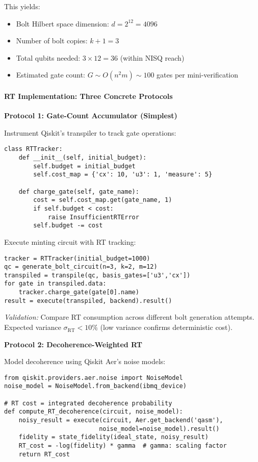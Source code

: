 \documentclass[a4paper,10.5pt,twoside]{article}
\begin{document}
This yields:
\begin{itemize}
    \item Bolt Hilbert space dimension: $d = 2^{12} = 4096$
    \item Number of bolt copies: $k+1 = 3$
    \item Total qubits needed: $3 \times 12 = 36$ (within NISQ reach)
    \item Estimated gate count: $G \sim O(n^2 m) \sim 100$ gates per mini-verification
\end{itemize}

\paragraph{RT Implementation: Three Concrete Protocols}

\textbf{Protocol 1: Gate-Count Accumulator (Simplest)}

Instrument Qiskit's transpiler to track gate operations:
\begin{verbatim}
class RTTracker:
    def __init__(self, initial_budget):
        self.budget = initial_budget
        self.cost_map = {'cx': 10, 'u3': 1, 'measure': 5}
    
    def charge_gate(self, gate_name):
        cost = self.cost_map.get(gate_name, 1)
        if self.budget < cost:
            raise InsufficientRTError
        self.budget -= cost
\end{verbatim}

Execute minting circuit with RT tracking:
\begin{verbatim}
tracker = RTTracker(initial_budget=1000)
qc = generate_bolt_circuit(n=3, k=2, m=12)
transpiled = transpile(qc, basis_gates=['u3','cx'])
for gate in transpiled.data:
    tracker.charge_gate(gate[0].name)
result = execute(transpiled, backend).result()
\end{verbatim}

\textit{Validation:} Compare RT consumption across different bolt generation attempts. Expected variance $\sigma_{\text{RT}} < 10\%$ (low variance confirms deterministic cost).

\textbf{Protocol 2: Decoherence-Weighted RT}

Model decoherence using Qiskit Aer's noise models:
\begin{verbatim}
from qiskit.providers.aer.noise import NoiseModel
noise_model = NoiseModel.from_backend(ibmq_device)

# RT cost = integrated decoherence probability
def compute_RT_decoherence(circuit, noise_model):
    noisy_result = execute(circuit, Aer.get_backend('qasm'),
                          noise_model=noise_model).result()
    fidelity = state_fidelity(ideal_state, noisy_result)
    RT_cost = -log(fidelity) * gamma  # gamma: scaling factor
    return RT_cost
\end{verbatim}
\end{document}
